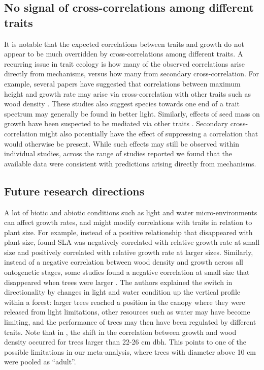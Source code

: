 \documentclass[a4paper,11pt]{article}
\begin{document}
\subsection*{No signal of cross-correlations among different traits}

It is notable that the expected correlations between traits and growth do not appear to be much overridden by cross-correlations among different traits. A recurring issue in trait ecology is how many of the observed correlations arise directly from mechanisms, versus how many from secondary cross-correlation. For example, several papers have suggested that correlations between maximum height and growth rate may arise via cross-correlation with other traits such as wood density \citep{Thomas:1996do, Poorter:2006vb, Wright:2010tp}. These studies also suggest species towards one end of a trait spectrum may generally be found in better light. Similarly, effects of seed mass on growth have been suspected to be mediated via other traits \citep{Shipley:1990js,Westoby:2002ft,Poorter:2006vb}. Secondary cross-correlation might also potentially have the effect of suppressing a correlation that would otherwise be present. While such effects may still be observed within individual studies, across the range of studies reported we found that the available data were consistent with predictions arising directly from mechanisms.

\subsection*{Future research directions}

A lot of biotic and abiotic conditions such as light and water micro-environments can affect growth rates, and might modify correlations with traits in relation to plant size. For example, instead of a positive relationship that disappeared with plant size, \citet{Iida:2014ep} found SLA was negatively correlated with relative growth rate at small size and positively correlated with relative growth rate at larger sizes. Similarly, instead of a negative correlation between wood density and growth across all ontogenetic stages, some studies found a negative correlation at small size that disappeared when trees were larger \citep{Iida:2014ep,Iida:2014hq}. The authors explained the switch in directionality by changes in light and water condition up the vertical profile within a forest: larger trees reached a position in the canopy where they were released from light limitations, other resources such as water may have become limiting, and the performance of trees may then have been regulated by different traits. Note that in \citet{Iida:2014hq}, the shift in the correlation between growth and wood density occurred for trees larger than 22-26 cm dbh. This points to one of the possible limitations in our meta-analysis, where trees with diameter above 10 cm were pooled as ``adult''.
\end{document}
